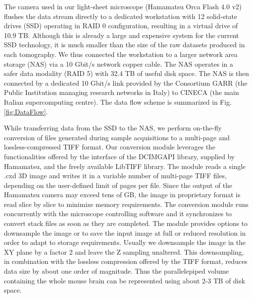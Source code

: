 \documentclass[12pt]{spieman}  %
\begin{document}
The camera used in our light-sheet microscope (Hamamatsu Orca Flash 4.0 v2) flushes the data stream directly to a dedicated workstation with 12 solid-state drives (SSD) operating in RAID 0 configuration, resulting in a virtual drive of 10.9 TB. Although this is already a large and expensive system for the current SSD technology, it is much smaller than the size of the raw datasets produced in each tomography. We thus connected the workstation to a larger network area storage (NAS) via a 10 Gbit/s network copper cable. The NAS operates in a safer data modality (RAID 5) with 32.4 TB of useful disk space. The NAS is then connected by a dedicated 10 Gbit/s link provided by the Consortium GARR (the Public Institution managing research networks in Italy) to CINECA (the main Italian supercomputing centre). The data flow scheme is summarized in Fig. \ref{fig:DataFlow}.


While transferring data from the SSD to the NAS, we perform on-the-fly conversion of files generated during sample acquisitions to a multi-page and lossless-compressed TIFF format. %
Our conversion module leverages the functionalities offered by the interface of the DCIMGAPI library, supplied by Hamamatsu, and the freely available LibTIFF library. The module reads a single .cxd 3D image and writes it in a variable number of multi-page TIFF files, depending on the user-defined limit of pages per file. Since the output of the Hamamatsu camera may exceed tens of GB, the image in proprietary format is read slice by slice to minimize memory requirements. The conversion module runs concurrently with the microscope controlling software and it synchronizes to convert stack files as soon as they are completed. The module provides options to downsample the image or to save the input image at full or reduced resolution in order to adapt to storage requirements. Usually we downsample the image in the XY plane by a factor 2 and leave the Z sampling unaltered. This downsampling, in combination with the lossless compression offered by the TIFF format, reduces data size by about one order of magnitude. Thus the parallelepiped volume containing the whole mouse brain can be represented using about 2-3 TB of disk space. 
\end{document}
